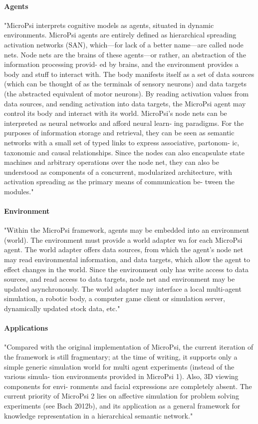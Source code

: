                 \paragraph{Agents}
"MicroPsi interprets cognitive models as agents, situated in dynamic environments. MicroPsi agents are entirely defined as hierarchical spreading activation networks (SAN), which—for lack of a better name—are called node nets. Node nets are the brains of these agents—or rather, an abstraction of the information processing provid- ed by brains, and the environment provides a body and stuff to interact with.
The body manifests itself as a set of data sources (which can be thought of as the terminals of sensory neurons) and data targets (the abstracted equivalent of motor neurons). By reading activation values from data sources, and sending activation into data targets, the MicroPsi agent may control its body and interact with its world.
MicroPsi’s node nets can be interpreted as neural networks and afford neural learn- ing paradigms. For the purposes of information storage and retrieval, they can be seen as semantic networks with a small set of typed links to express associative, partonom- ic, taxonomic and causal relationships.
Since the nodes can also encapsulate state machines and arbitrary operations over the node net, they can also be understood as components of a concurrent, modularized architecture, with activation spreading as the primary means of communication be- tween the modules."~\cite{conf/agi/Bach12}

                \paragraph{Environment}
"Within the MicroPsi framework, agents may be embedded into an environment (world). The environment must provide a world adapter wa for each MicroPsi agent. The world adapter offers data sources, from which the agent’s node net may read environmental information, and data targets, which allow the agent to effect changes in the world. Since the environment only has write access to data sources, and read access to data targets, node net and environment may be updated asynchronously.
The world adapter may interface a local multi-agent simulation, a robotic body, a computer game client or simulation server, dynamically updated stock data, etc."~\cite{conf/agi/Bach12}

                \paragraph{Applications}
"Compared with the original implementation of MicroPsi, the current iteration of the framework is still fragmentary; at the time of writing, it supports only a simple generic simulation world for multi agent experiments (instead of the various simula- tion environments provided in MicroPsi 1). Also, 3D viewing components for envi- ronments and facial expressions are completely absent.
The current priority of MicroPsi 2 lies on affective simulation for problem solving experiments (see Bach 2012b), and its application as a general framework for knowledge representation in a hierarchical semantic network."~\cite{conf/agi/Bach12}


